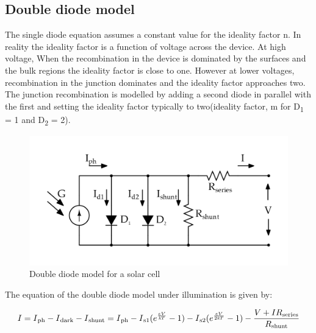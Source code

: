 \subsection{Double diode model}\label{sec:DDM}

The single diode equation assumes a constant value for the ideality factor n. In reality the ideality factor is a function of voltage across the device. At high voltage, When the recombination in the device is dominated by the surfaces and the bulk regions the ideality factor is close to one. However at lower voltages, recombination in the junction dominates and the ideality factor approaches two. The junction recombination is modelled by adding a second diode in parallel with the first and setting the ideality factor typically to two(ideality factor, m for D\textsubscript{1} = 1 and D\textsubscript{2} = 2)\cite{pv_education_org}.\\

 \begin{figure}[H]
  \begin{center}
  \includegraphics[width=\textwidth]{images/Double_diode_model}
  \caption{ Double diode model for a solar cell }
  \label{fig:Double_EQu_cell}
  \end{center}
  \end{figure}
  
The equation of the double diode model under illumination is given by:  

  \begin{equation}
   \begin{aligned}
    I = I\textsubscript{ph} - I\textsubscript{dark} - I\textsubscript{shunt} = I\textsubscript{ph} -  I\textsubscript{s1} (e^{\frac{eV}{\textit{k}T}}-1) - I\textsubscript{s2} (e^{\frac{eV}{2\textit{k}T}}-1)- \dfrac{V+IR\textsubscript{series}}{R\textsubscript{shunt}}
     \label{eq:equ_current_double}
    \end{aligned}
    \end{equation}
  
